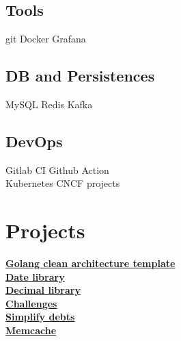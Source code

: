 \documentclass[]{deedy-resume-openfont}
\begin{document}
\begin{minipage}[t]{0.3\textwidth}
\subsection{Tools}
git \textbullet{}  Docker \textbullet{} Grafana
\sectionsep
\subsection{DB and Persistences}
MySQL \textbullet{}  Redis \textbullet{} Kafka
\sectionsep
\subsection{DevOps}
Gitlab CI \textbullet{} Github Action \textbullet{} \\
Kubernetes \textbullet{} CNCF projects
\sectionsep


\section{Projects}
\textbullet{} \href{https://github.com/lovung/GoCleanArchitecture}{\bf Golang clean architecture template } \\
\textbullet{} \href{https://github.com/lovung/date}{\bf Date library} \\
\textbullet{} \href{https://github.com/lovung/decimal}{\bf Decimal library} \\
\textbullet{} \href{https://github.com/lovung/challenges}{\bf Challenges} \\
\textbullet{} \href{https://github.com/lovung/simplify-debts-demo}{\bf Simplify debts} \\
\textbullet{} \href{https://github.com/lovung/memcache}{\bf Memcache} \\

%
%

\end{minipage} 
\hfill
\end{document}

